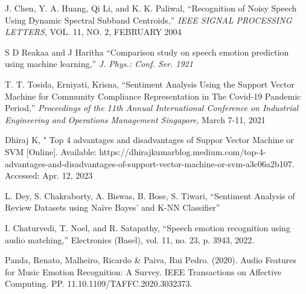 \documentclass[conference]{IEEEtran}
\begin{document}
\begin{thebibliography}{00}
 J. Chen, Y. A. Huang, Qi Li, and K. K. Paliwal,
“Recognition of Noisy Speech Using Dynamic Spectral Subband Centroids,” \emph{IEEE SIGNAL PROCESSING LETTERS}, VOL. 11, NO. 2, FEBRUARY 2004

 S D Reakaa and J Haritha “Comparison study on speech emotion prediction using machine learning,” \emph{J. Phys.: Conf. Ser. 1921}

 T. T. Tosida, Erniyati, Krisna, “Sentiment Analysis Using the Support Vector Machine for Community Compliance Representation
in The Covid-19 Pandemic Period,” \emph{Proceedings of the 11th Annual International Conference on Industrial Engineering and Operations Management Singapore}, March 7-11, 2021 

 Dhiraj K, " Top 4 advantages and disadvantages of Suppor Vector Machine or SVM [Online]. Available:
https://dhirajkumarblog.medium.com/top-4-advantages-and-disadvantages-of-support-vector-machine-or-svm-a3c06a2b107. Accessed: Apr. 12, 2023

 L. Dey, S. Chakraborty, A. Biswas, B. Bose, S. Tiwari, “Sentiment Analysis of Review Datasets using Naïve Bayes’ and K-NN Classifier”

	I. Chaturvedi, T. Noel, and R. Satapathy, “Speech emotion recognition using audio matching,” Electronics (Basel), vol. 11, no. 23, p. 3943, 2022.

 Panda, Renato, Malheiro, Ricardo & Paiva, Rui Pedro. (2020). Audio Features for Music Emotion Recognition: A Survey. IEEE Transactions on Affective Computing. PP. 11.10.1109/TAFFC.2020.3032373. 


\end{thebibliography}
\end{document}
